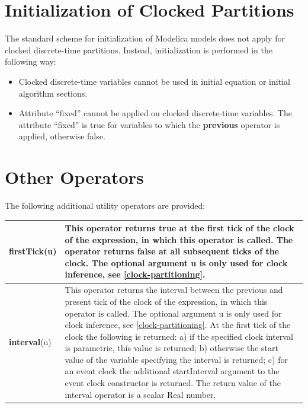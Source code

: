 \documentclass[10pt,a4paper]{report}
\def\doublelabel#1{\label{#1}}
\begin{document}
\section{Initialization of Clocked Partitions}\doublelabel{initialization-of-clocked-partitions}

The standard scheme for initialization of Modelica models does not apply
for clocked discrete-time partitions. Instead, initialization is
performed in the following way:

\begin{itemize}
\item
  Clocked discrete-time variables cannot be used in initial equation or
  initial algorithm sections.
\item
  Attribute ``fixed'' cannot be applied on clocked discrete-time
  variables. The attribute ``fixed'' is true for variables to which the
  \textbf{previous} operator is applied, otherwise false.
\end{itemize}

\section{Other Operators}\doublelabel{other-operators}

The following additional utility operators are provided:

\begin{longtable}[]{|l|p{12cm}|}
\hline \endhead
\textbf{firstTick}(u)&
This operator returns true at the first tick of the clock of the
expression, in which this operator is called. The operator returns false
at all subsequent ticks of the clock. The optional argument u is only
used for clock inference, see \ref{clock-partitioning}.\\ \hline
\textbf{interval}(u)&
This operator returns the interval between the previous and present tick
of the clock of the expression, in which this operator is called. The
optional argument u is only used for clock inference, see \ref{clock-partitioning}.
At the first tick of the clock the following is returned: a) if the
specified clock interval is parametric, this value is returned; b)
otherwise the start value of the variable specifying the interval is
returned; c) for an event clock the additional startInterval argument to
the event clock constructor is returned. The return value of the
interval operator is a scalar Real number.
\\ \hline
\end{longtable}
\end{document}
